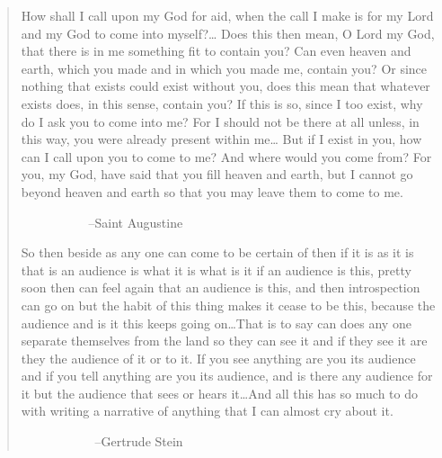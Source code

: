 \documentclass[
]{memoir}
\begin{document}
\begin{quote}
How shall I call upon my God for aid, when the call I make is for my
Lord and my God to come into myself?\ldots{} Does this then mean, O Lord
my God, that there is in me something fit to contain you? Can even
heaven and earth, which you made and in which you made me, contain you?
Or since nothing that exists could exist without you, does this mean
that whatever exists does, in this sense, contain you? If this is so,
since I too exist, why do I ask you to come into me? For I should not be
there at all unless, in this way, you were already present within
me\ldots{} But if I exist in you, how can I call upon you to come to me?
And where would you come from? For you, my God, have said that you fill
heaven and earth, but I cannot go beyond heaven and earth so that you
may leave them to come to me.

~~~~~~~~~~ --Saint Augustine

So then beside as any one can come to be certain of then if it is as it
is that is an audience is what it is what is it if an audience is this,
pretty soon then can feel again that an audience is this, and then
introspection can go on but the habit of this thing makes it cease to be
this, because the audience and is it this keeps going on\ldots{}That is
to say can does any one separate themselves from the land so they can
see it and if they see it are they the audience of it or to it. If you
see anything are you its audience and if you tell anything are you its
audience, and is there any audience for it but the audience that sees or
hears it\ldots{}And all this has so much to do with writing a narrative
of anything that I can almost cry about it.

~~~~~~~~~~ ~--Gertrude Stein
\end{quote}
\end{document}

